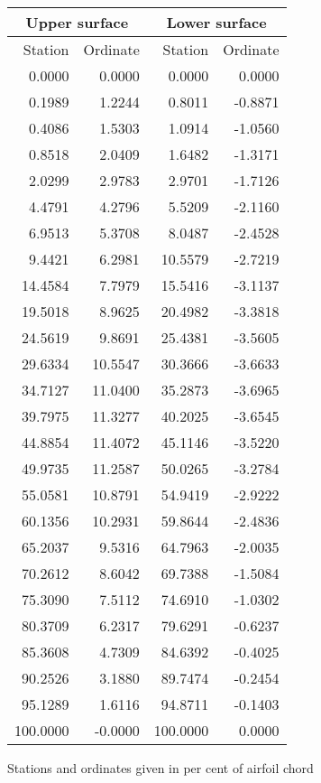 \documentclass[11pt]{book}
\begin{document}
 \hspace{4mm}
 \begin{tabular}{|r|r|r|r|} \hline 
 \multicolumn{2}{|c|}{Upper surface} & \multicolumn{2}{|c|}{Lower surface} \\
 \hline
 Station & Ordinate & Station & Ordinate \\
 \hline
0.0000 & 0.0000 & 0.0000 & 0.0000 \\
0.1989 & 1.2244 & 0.8011 & -0.8871 \\
0.4086 & 1.5303 & 1.0914 & -1.0560 \\
0.8518 & 2.0409 & 1.6482 & -1.3171 \\
2.0299 & 2.9783 & 2.9701 & -1.7126 \\
4.4791 & 4.2796 & 5.5209 & -2.1160 \\
6.9513 & 5.3708 & 8.0487 & -2.4528 \\
9.4421 & 6.2981 & 10.5579 & -2.7219 \\
14.4584 & 7.7979 & 15.5416 & -3.1137 \\
19.5018 & 8.9625 & 20.4982 & -3.3818 \\
24.5619 & 9.8691 & 25.4381 & -3.5605 \\
29.6334 & 10.5547 & 30.3666 & -3.6633 \\
34.7127 & 11.0400 & 35.2873 & -3.6965 \\
39.7975 & 11.3277 & 40.2025 & -3.6545 \\
44.8854 & 11.4072 & 45.1146 & -3.5220 \\
49.9735 & 11.2587 & 50.0265 & -3.2784 \\
55.0581 & 10.8791 & 54.9419 & -2.9222 \\
60.1356 & 10.2931 & 59.8644 & -2.4836 \\
65.2037 & 9.5316 & 64.7963 & -2.0035 \\
70.2612 & 8.6042 & 69.7388 & -1.5084 \\
75.3090 & 7.5112 & 74.6910 & -1.0302 \\
80.3709 & 6.2317 & 79.6291 & -0.6237 \\
85.3608 & 4.7309 & 84.6392 & -0.4025 \\
90.2526 & 3.1880 & 89.7474 & -0.2454 \\
95.1289 & 1.6116 & 94.8711 & -0.1403 \\
100.0000 & -0.0000 & 100.0000 & 0.0000 \\
 \hline 
 \end{tabular}
 \vspace{8mm}

Stations and ordinates given in per cent of airfoil chord
\end{document}
